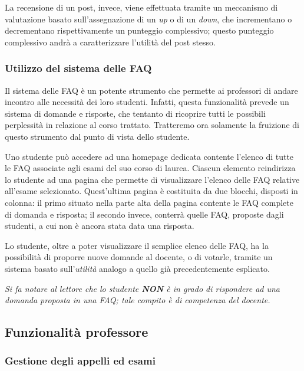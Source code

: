\documentclass [a4paper,11pt]{book}
\begin{document}
La recensione di un post, invece, viene effettuata tramite un meccanismo di valutazione basato sull'assegnazione di un \emph{up} o di un \emph{down}, che incrementano o decrementano rispettivamente un punteggio complessivo; questo punteggio complessivo andrà a caratterizzare l'utilità del post stesso.

\medskip

\subsubsection{Utilizzo del sistema delle FAQ}

Il sistema delle FAQ è un potente strumento che permette ai professori di andare incontro alle necessità dei loro studenti. Infatti, questa funzionalità prevede un sistema di domande e risposte, che tentanto di ricoprire tutti le possibili perplessità in relazione al corso trattato. Tratteremo ora solamente la fruizione di questo strumento dal punto di vista dello studente.

Uno studente può accedere ad una homepage dedicata contente l'elenco di tutte le FAQ associate agli esami del suo corso di laurea. Ciascun elemento reindirizza lo studente ad una pagina che permette di visualizzare l'elenco delle FAQ relative all'esame selezionato. Quest'ultima pagina è costituita da due blocchi, disposti in colonna: il primo situato nella parte alta della pagina contente le FAQ complete di domanda e risposta; il secondo invece, conterrà quelle FAQ, proposte dagli studenti, a cui non è ancora stata data una risposta.

Lo studente, oltre a poter visualizzare il semplice elenco delle FAQ, ha la possibilità di proporre nuove domande al docente, o di votarle, tramite un sistema basato sull'\emph{utilità} analogo a quello già precedentemente esplicato. 

\emph{Si fa notare al lettore che lo studente \textbf{NON} è in grado di rispondere ad una domanda proposta in una FAQ; tale compito è di competenza del docente.}

\medskip

\subsection{Funzionalità professore}

\subsubsection{Gestione degli appelli ed esami}
\label{sec:verb}
\end{document}
